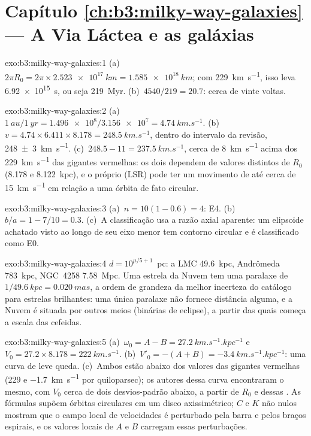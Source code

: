 \section*{Capítulo \ref{ch:b3:milky-way-galaxies} --- A Via Láctea e as galáxias}

\begin{solution}{exo:b3:milky-way-galaxies:1}
(a)~$2\pi R_0 = 2\pi\times\qty{2.523e17}{km} = \qty{1.585e18}{km}$; com
\qty{229}{km.s^{-1}}, isso leva \qty{6.92e15}{s}, ou seja
\qty{219}{Myr}. (b)~$4540/219 = 20.7$: cerca de vinte voltas.
\end{solution}

\begin{solution}{exo:b3:milky-way-galaxies:2}
(a)~$\qty{1}{au}/\qty{1}{yr} = \num{1.496e8}/\num{3.156e7} =
\qty{4.74}{km.s^{-1}}$. (b)~$v = 4.74\times6.411\times8.178 =
\qty{248.5}{km.s^{-1}}$, dentro do intervalo da revisão,
\qty[separate-uncertainty=true]{248 \pm 3}{km.s^{-1}}. (c)~$248.5 - 11 = \qty{237.5}{km.s^{-1}}$,
cerca de \qty{8}{km.s^{-1}} acima dos \qty{229}{km.s^{-1}} das gigantes vermelhas:
os dois dependem de valores distintos de $R_0$ (8.178 e \qty{8.122}{kpc}),
e o próprio  (LSR) pode ter um movimento de até cerca de \qty{15}{km.s^{-1}} em relação
a uma órbita de fato circular.
\end{solution}

\begin{solution}{exo:b3:milky-way-galaxies:3}
(a)~$n = 10(1 - 0.6) = 4$: E4. (b)~$b/a = 1 - 7/10 = 0.3$. (c)~A classificação
usa a razão axial aparente: um elipsoide achatado visto ao longo de seu eixo menor
tem contorno circular e é classificado como E0.
\end{solution}

\begin{solution}{exo:b3:milky-way-galaxies:4}
$d = 10^{\mu/5 + 1}$~pc: a LMC \qty{49.6}{kpc}, Andrômeda
\qty{783}{kpc}, NGC~4258 \qty{7.58}{Mpc}. Uma estrela da Nuvem tem uma
paralaxe de $1/\qty{49.6}{kpc} = \qty{0.020}{mas}$, a ordem de grandeza da melhor
incerteza do catálogo para estrelas brilhantes: uma única paralaxe não fornece
distância alguma, e a Nuvem é situada por outros meios (binárias de
eclipse), a partir das quais começa a escala das cefeidas.
\end{solution}

\begin{solution}{exo:b3:milky-way-galaxies:5}
(a)~$\omega_0 = A - B = \qty{27.2}{km.s^{-1}.kpc^{-1}}$ e $V_0 =
27.2\times8.178 = \qty{222}{km.s^{-1}}$. (b)~$V'_0 = -(A + B) =
\qty{-3.4}{km.s^{-1}.kpc^{-1}}$: uma curva de leve queda. (c)~Ambos estão
abaixo dos valores das gigantes vermelhas (229 e \qty{-1.7}{km.s^{-1}} por
quiloparsec); os autores dessa curva encontraram o mesmo, com $V_0$ cerca de dois
desvios-padrão abaixo, a partir de $R_0$ e dessas . As
fórmulas supõem órbitas circulares em um disco axissimétrico; $C$ e
$K$ não nulos mostram que o campo local de velocidades é perturbado pela barra e pelos
braços espirais, e os valores locais de $A$ e $B$ carregam essas perturbações.
\end{solution}

